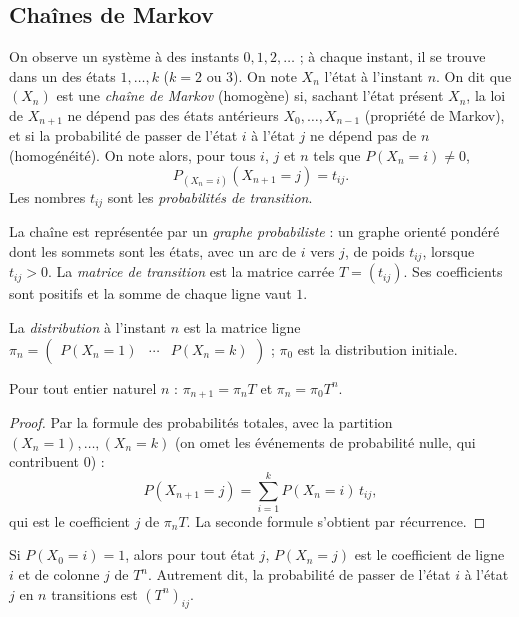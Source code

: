 \subsection{Chaînes de Markov}
\begin{definition}
On observe un système à des instants $0,1,2,\dots$ ; à chaque instant, il se trouve dans un des états $1,\dots,k$ ($k=2$ ou $3$). On note $X_n$ l'état à l'instant $n$. On dit que $(X_n)$ est une \emph{chaîne de Markov} (homogène) si, sachant l'état présent $X_n$, la loi de $X_{n+1}$ ne dépend pas des états antérieurs $X_0,\dots,X_{n-1}$ (propriété de Markov), et si la probabilité de passer de l'état $i$ à l'état $j$ ne dépend pas de $n$ (homogénéité). On note alors, pour tous $i$, $j$ et $n$ tels que $P(X_n=i)\neq0$,
\[P_{(X_n=i)}(X_{n+1}=j)=t_{ij}.\]
Les nombres $t_{ij}$ sont les \emph{probabilités de transition}.
\end{definition}
\begin{definition}
La chaîne est représentée par un \emph{graphe probabiliste} : un graphe orienté pondéré dont les sommets sont les états, avec un arc de $i$ vers $j$, de poids $t_{ij}$, lorsque $t_{ij}>0$. La \emph{matrice de transition} est la matrice carrée $T=(t_{ij})$. Ses coefficients sont positifs et la somme de chaque ligne vaut $1$.
\end{definition}
\begin{definition}[Distribution]
La \emph{distribution} à l'instant $n$ est la matrice ligne $\pi_n=\begin{pmatrix}P(X_n=1)&\cdots&P(X_n=k)\end{pmatrix}$ ; $\pi_0$ est la distribution initiale.
\end{definition}
\begin{theorem}
Pour tout entier naturel $n$ : $\pi_{n+1}=\pi_nT$ et $\pi_n=\pi_0T^n$.
\end{theorem}
\begin{proof}
Par la formule des probabilités totales, avec la partition $\left(X_n=1\right),\dots,\left(X_n=k\right)$ (on omet les événements de probabilité nulle, qui contribuent $0$) :
\[P(X_{n+1}=j)=\sum_{i=1}^{k}P(X_n=i)\,t_{ij},\]
qui est le coefficient $j$ de $\pi_nT$. La seconde formule s'obtient par récurrence.
\end{proof}
\begin{theorem}
Si $P(X_0=i)=1$, alors pour tout état $j$, $P(X_n=j)$ est le coefficient de ligne $i$ et de colonne $j$ de $T^n$. Autrement dit, la probabilité de passer de l'état $i$ à l'état $j$ en $n$ transitions est $\left(T^n\right)_{ij}$.
\end{theorem}
